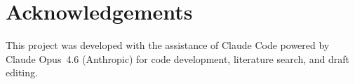 \documentclass{article}
\begin{document}
\section*{Acknowledgements}
This project was developed with the assistance of Claude Code powered by Claude Opus~4.6 (Anthropic) for code development, literature search, and draft editing.



\end{document}
